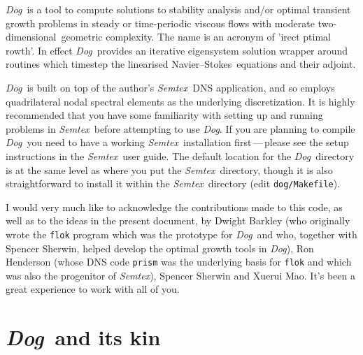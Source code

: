 \documentclass[11pt,a4paper]{report}
\newcommand\NavSto{Navier--Stokes}
\newcommand\twod{two-di\-men\-sion\-al}
\newcommand{\Semtex}{\emph{Semtex}}
\newcommand{\Dog}{\emph{Dog}}
\newcommand\undertext[1]{\underline{\smash{\hbox{#1}}}}
\begin{document}
\Dog\ is a tool to compute solutions to stability analysis and/or
optimal transient growth problems in steady or time-periodic viscous
flows with moderate \twod\ geometric complexity.  The name is an
acronym of '\undertext{d}irect \undertext{o}ptimal
\undertext{g}rowth'.
%
In effect \Dog\ provides an iterative eigensystem solution wrapper
around routines which timestep the linearised \NavSto\ equations and
their adjoint.

\Dog\ is built on top of the author's \Semtex\ DNS application, and so
employs quadrilateral nodal spectral elements as the underlying
discretization. It is highly recommended that you have some
familiarity with setting up and running problems in \Semtex\ before
attempting to use \Dog. If you are planning to compile \Dog\ you need
to have a working \Semtex\ installation first\,---\,please see the
setup instructions in the \Semtex\ user guide.  The default location
for the \Dog\ directory is at the same level as where you put the
\Semtex\ directory, though it is also straightforward to install it
within the \Semtex\ directory (edit \verb+dog/Makefile+).

I would very much like to acknowledge the contributions made to this
code, as well as to the ideas in the present document, by Dwight
Barkley (who originally wrote the \texttt{flok} program which was the
prototype for \Dog\ and who, together with Spencer Sherwin, helped
develop the optimal growth tools in \Dog), Ron Henderson (whose DNS
code \texttt{prism} was the underlying basis for \texttt{flok} and
which was also the progenitor of \Semtex), Spencer Sherwin and Xuerui
Mao.  It's been a great experience to work with all of you.

\section{\Dog\ and its kin}
\end{document}
